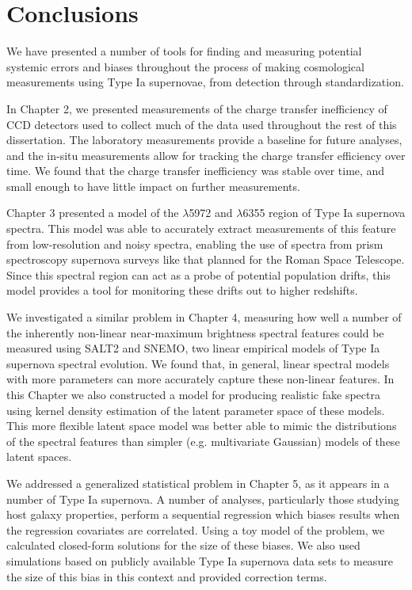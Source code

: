 \chapter{Conclusions}

We have presented a number of tools for finding and measuring potential systemic errors and biases throughout the process of making cosmological measurements using Type Ia supernovae, from detection through standardization.

In Chapter 2, we presented measurements of the charge transfer inefficiency of CCD detectors used to collect much of the data used throughout the rest of this dissertation. The laboratory measurements provide a baseline for future analyses, and the in-situ measurements allow for tracking the charge transfer efficiency over time. We found that the charge transfer inefficiency was stable over time, and small enough to have little impact on further measurements.

Chapter 3 presented a model of the  $\lambda$5972 and  $\lambda$6355 region of Type Ia supernova spectra. This model was able to accurately extract measurements of this feature from low-resolution and noisy spectra, enabling the use of spectra from prism spectroscopy supernova surveys like that planned for the Roman Space Telescope. Since this spectral region can act as a probe of potential population drifts, this model provides a tool for monitoring these drifts out to higher redshifts.

We investigated a similar problem in Chapter 4, measuring how well a number of the inherently non-linear near-maximum brightness spectral features could be measured using SALT2 and SNEMO, two linear empirical models of Type Ia supernova spectral evolution. We found that, in general, linear spectral models with more parameters can more accurately capture these non-linear features. In this Chapter we also constructed a model for producing realistic fake spectra using kernel density estimation of the latent parameter space of these models. This more flexible latent space model was better able to mimic the distributions of the spectral features than simpler (e.g. multivariate Gaussian) models of these latent spaces.

We addressed a generalized statistical problem in Chapter 5, as it appears in a number of Type Ia supernova. A number of analyses, particularly those studying host galaxy properties, perform a sequential regression which biases results when the regression covariates are correlated. Using a toy model of the problem, we calculated closed-form solutions for the size of these biases. We also used simulations based on publicly available Type Ia supernova data sets to measure the size of this bias in this context and provided correction terms.

